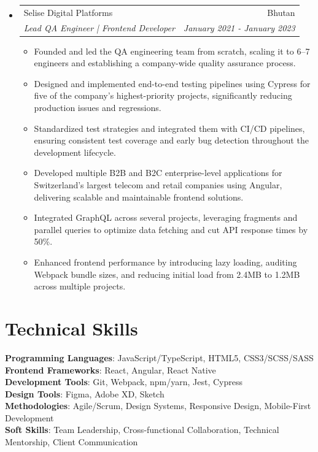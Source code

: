 \documentclass[letterpaper,11pt]{article}
\makeatletter
\newcommand{\resumeItem}[1]{
  \item\small{
    {#1 \vspace{-2pt}}
  }
}
\newcommand{\resumeSubheading}[4]{
  \vspace{-2pt}\item
    \begin{tabular*}{0.97\textwidth}[t]{l@{\extracolsep{\fill}}r}
      {#1} & #2 \\
      \textit{\small#3} & \textit{\small #4} \\
    \end{tabular*}\vspace{-7pt}
}
\newcommand{\resumeSubHeadingListStart}{\begin{itemize}[leftmargin=0.15in, label={}]}
\newcommand{\resumeSubHeadingListEnd}{\end{itemize}}
\newcommand{\resumeItemListStart}{\begin{itemize}}
\newcommand{\resumeItemListEnd}{\end{itemize}\vspace{-5pt}}
\makeatother
\begin{document}
\resumeSubHeadingListStart
      \resumeSubheading
      {Selise Digital Platforms}{Bhutan}
      {Lead QA Engineer | Frontend Developer}{January 2021 - January 2023}
      \resumeItemListStart
        \resumeItem{Founded and led the QA engineering team from scratch, scaling it to 6–7 engineers and establishing a company-wide quality assurance process.}
        \resumeItem{Designed and implemented end-to-end testing pipelines using Cypress for five of the company’s highest-priority projects, significantly reducing production issues and regressions.}
        \resumeItem{Standardized test strategies and integrated them with CI/CD pipelines, ensuring consistent test coverage and early bug detection throughout the development lifecycle.}
        \resumeItem{Developed multiple B2B and B2C enterprise-level applications for Switzerland’s largest telecom and retail companies using Angular, delivering scalable and maintainable frontend solutions.}
        \resumeItem{Integrated GraphQL across several projects, leveraging fragments and parallel queries to optimize data fetching and cut API response times by 50\%.}
        \resumeItem{Enhanced frontend performance by introducing lazy loading, auditing Webpack bundle sizes, and reducing initial load from 2.4MB to 1.2MB across multiple projects.}

     \resumeItemListEnd
  \resumeSubHeadingListEnd


\section{Technical Skills}
 \begin{itemize}[leftmargin=0.15in, label={}]
    \small{\item{
     \textbf{Programming Languages}{: JavaScript/TypeScript, HTML5, CSS3/SCSS/SASS} \\
     \textbf{Frontend Frameworks}{: React, Angular, React Native} \\
     \textbf{Development Tools}{: Git, Webpack, npm/yarn, Jest, Cypress} \\
     \textbf{Design Tools}{: Figma, Adobe XD, Sketch} \\
     \textbf{Methodologies}{: Agile/Scrum, Design Systems, Responsive Design, Mobile-First Development} \\
     \textbf{Soft Skills}{: Team Leadership, Cross-functional Collaboration, Technical Mentorship, Client Communication}
    }}
 \end{itemize}
\end{document}
